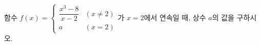 함수 $f(x)=\begin{cases} \dfrac{x^3-8}{x-2} & (x\ne 2) \\ a & (x=2) \end{cases}$가 $x=2$에서 연속일 때, 상수 $a$의 값을 구하시오.
